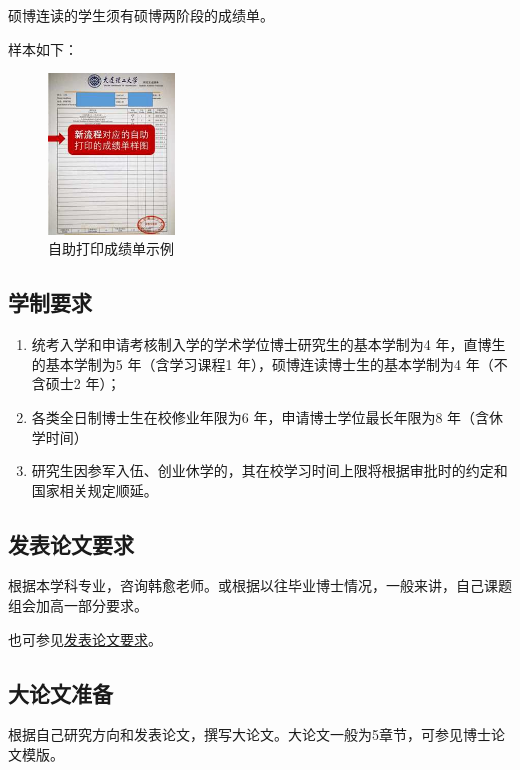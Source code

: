 \documentclass[12pt,a4paper]{ctexart}
\begin{document}
硕博连读的学生须有硕博两阶段的成绩单。

样本如下：

\begin{figure}[H]
  \centering
  \includegraphics[width=0.3\textwidth]{images/meritList.jpg}  %
  \caption{自助打印成绩单示例}
\end{figure}

\subsection{学制要求}
\label{sec:yearRequire}

\begin{enumerate}
\item 统考入学和申请考核制入学的学术学位博士研究生的基本学制为4 年，直博生的基本学制为5 年（含学习课程1 年），硕博连读博士生的基本学制为4 年（不含硕士2 年）；
\item 各类全日制博士生在校修业年限为6 年，申请博士学位最长年限为8 年（含休学时间）
\item 研究生因参军入伍、创业休学的，其在校学习时间上限将根据审批时的约定和国家相关规定顺延。
\end{enumerate}


\subsection{发表论文要求}
\label{sec:paperRequire}

根据本学科专业，咨询韩愈老师。或根据以往毕业博士情况，一般来讲，自己课题组会加高一部分要求。

也可参见\href{https://gs.dlut.edu.cn/yjspy/xwgl12/fblwyq1.htm}{发表论文要求}。

\subsection{大论文准备}
\label{sec:thesisRequire}

根据自己研究方向和发表论文，撰写大论文。大论文一般为5章节，可参见博士论文模版。
\end{document}
